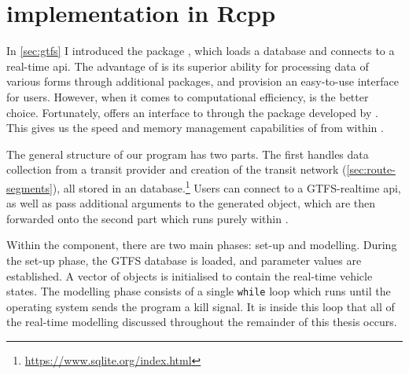 

\section{\Rt{} implementation in Rcpp}
\label{sec:rt-implementation}

In \cref{sec:gtfs} I introduced the \Rstats{} package , which loads a \GTFS{} database and connects to a real-time \gls{api}. The advantage of \Rstats{} \citep{rcore} is its superior ability for processing data of various forms through additional packages, and provision an easy-to-use interface for users. However, when it comes to computational efficiency, \Cpp{} is the better choice. Fortunately, \Rstats{} offers an interface to \Cpp{} through the  package developed by \citet{Rcpp}. This gives us the speed and memory management capabilities of \Cpp{} from within \Rstats{}.

The general structure of our program has two parts. The first handles data collection from a transit provider and creation of the transit network (\cref{sec:route-segments}), all stored in an  database.\footnote{\url{https://www.sqlite.org/index.html}} Users can connect to a GTFS-realtime \gls{api}, as well as pass additional arguments to the generated  object, which are then forwarded onto the second part which runs purely within \Cpp{}.

Within the \Cpp{} component, there are two main phases: set-up and modelling. During the set-up phase, the GTFS database is loaded, and parameter values are established. A vector of  objects is initialised to contain the real-time vehicle states. The modelling phase consists of a single \verb+while+ loop which runs until the operating system sends the program a kill signal. It is inside this loop that all of the real-time modelling discussed throughout the remainder of this thesis occurs.

